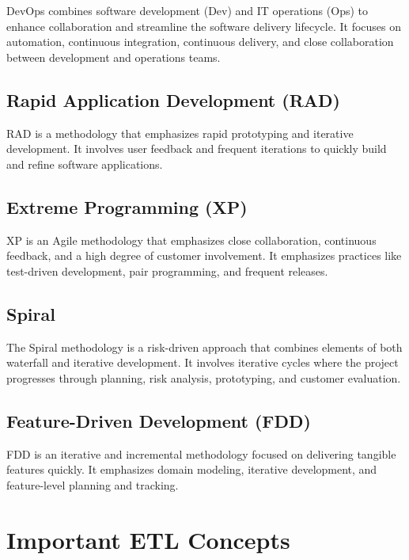 \documentclass[]{report}
\begin{document}
DevOps combines software development (Dev) and IT operations (Ops) to enhance collaboration and streamline the software delivery lifecycle. It focuses on automation, continuous integration, continuous delivery, and close collaboration between development and operations teams.

\section{Rapid Application Development (RAD)}

RAD is a methodology that emphasizes rapid prototyping and iterative development. It involves user feedback and frequent iterations to quickly build and refine software applications.

\section{Extreme Programming (XP)}

XP is an Agile methodology that emphasizes close collaboration, continuous feedback, and a high degree of customer involvement. It emphasizes practices like test-driven development, pair programming, and frequent releases.

\section{Spiral}

The Spiral methodology is a risk-driven approach that combines elements of both waterfall and iterative development. It involves iterative cycles where the project progresses through planning, risk analysis, prototyping, and customer evaluation.

\section{Feature-Driven Development (FDD)}

FDD is an iterative and incremental methodology focused on delivering tangible features quickly. It emphasizes domain modeling, iterative development, and feature-level planning and tracking.

\chapter{Important ETL Concepts}
\end{document}
